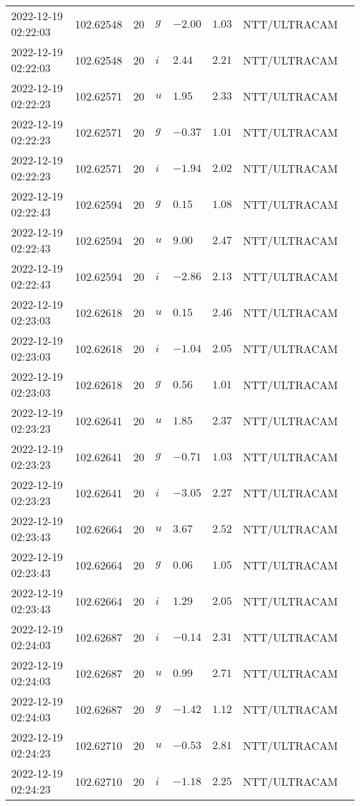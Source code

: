 \documentclass{nature_plusfigure}
\begin{document}
\begin{supplement}
\begin{center}
\begin{longtable}{llllllll}
2022-12-19 02:22:03 & 102.62548 & 20 & $g$ & $-2.00$ & $1.03$ & NTT/ULTRACAM &  \\ 
2022-12-19 02:22:03 & 102.62548 & 20 & $i$ & $2.44$ & $2.21$ & NTT/ULTRACAM &  \\ 
2022-12-19 02:22:23 & 102.62571 & 20 & $u$ & $1.95$ & $2.33$ & NTT/ULTRACAM &  \\ 
2022-12-19 02:22:23 & 102.62571 & 20 & $g$ & $-0.37$ & $1.01$ & NTT/ULTRACAM &  \\ 
2022-12-19 02:22:23 & 102.62571 & 20 & $i$ & $-1.94$ & $2.02$ & NTT/ULTRACAM &  \\ 
2022-12-19 02:22:43 & 102.62594 & 20 & $g$ & $0.15$ & $1.08$ & NTT/ULTRACAM &  \\ 
2022-12-19 02:22:43 & 102.62594 & 20 & $u$ & $9.00$ & $2.47$ & NTT/ULTRACAM &  \\ 
2022-12-19 02:22:43 & 102.62594 & 20 & $i$ & $-2.86$ & $2.13$ & NTT/ULTRACAM &  \\ 
2022-12-19 02:23:03 & 102.62618 & 20 & $u$ & $0.15$ & $2.46$ & NTT/ULTRACAM &  \\ 
2022-12-19 02:23:03 & 102.62618 & 20 & $i$ & $-1.04$ & $2.05$ & NTT/ULTRACAM &  \\ 
2022-12-19 02:23:03 & 102.62618 & 20 & $g$ & $0.56$ & $1.01$ & NTT/ULTRACAM &  \\ 
2022-12-19 02:23:23 & 102.62641 & 20 & $u$ & $1.85$ & $2.37$ & NTT/ULTRACAM &  \\ 
2022-12-19 02:23:23 & 102.62641 & 20 & $g$ & $-0.71$ & $1.03$ & NTT/ULTRACAM &  \\ 
2022-12-19 02:23:23 & 102.62641 & 20 & $i$ & $-3.05$ & $2.27$ & NTT/ULTRACAM &  \\ 
2022-12-19 02:23:43 & 102.62664 & 20 & $u$ & $3.67$ & $2.52$ & NTT/ULTRACAM &  \\ 
2022-12-19 02:23:43 & 102.62664 & 20 & $g$ & $0.06$ & $1.05$ & NTT/ULTRACAM &  \\ 
2022-12-19 02:23:43 & 102.62664 & 20 & $i$ & $1.29$ & $2.05$ & NTT/ULTRACAM &  \\ 
2022-12-19 02:24:03 & 102.62687 & 20 & $i$ & $-0.14$ & $2.31$ & NTT/ULTRACAM &  \\ 
2022-12-19 02:24:03 & 102.62687 & 20 & $u$ & $0.99$ & $2.71$ & NTT/ULTRACAM &  \\ 
2022-12-19 02:24:03 & 102.62687 & 20 & $g$ & $-1.42$ & $1.12$ & NTT/ULTRACAM &  \\ 
2022-12-19 02:24:23 & 102.62710 & 20 & $u$ & $-0.53$ & $2.81$ & NTT/ULTRACAM &  \\ 
2022-12-19 02:24:23 & 102.62710 & 20 & $i$ & $-1.18$ & $2.25$ & NTT/ULTRACAM &  \\ 

\end{longtable}
\end{center}
\end{supplement}
\end{document}
